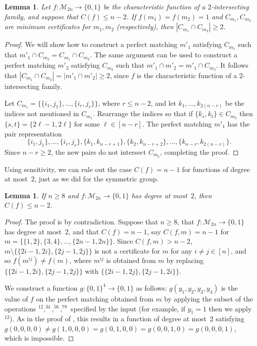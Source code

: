 \documentclass[10pt,a4paper]{amsart}
\newtheorem{lemma}[theorem]{Lemma}
\theoremstyle{definition}
\providecommand{\cM}{\mathcal{M}}
\begin{document}
\begin{lemma} \label{lem:2-int-coset-pms}
Let $f\colon \cM_{2n} \to \{0,1\}$ be the characteristic function of a $2$-intersecting family, and suppose that $C(f) \leq n-2$. If $f(m_1) = f(m_2) = 1$ and $C_{m_1},C_{m_2}$ are minimum certificates for $m_1,m_2$ (respectively), then $|C_{m_1} \cap C_{m_2}| \geq 2$.
\end{lemma}
\begin{proof}
We will show how to construct a perfect matching $m'_1$ satisfying $C_{m_1}$ such that $m'_1 \cap C_{m_2} = C_{m_1} \cap C_{m_2}$. The same argument can be used to construct a perfect matching $m'_2$ satisfying $C_{m_2}$ such that $m'_1 \cap m'_2 = m'_1 \cap C_{m_2}$. It follows that $|C_{m_1} \cap C_{m_2}| = |m'_1 \cap m'_2| \geq 2$, since $f$ is the characteristic function of a $2$-intersecting family.

Let $C_{m_1} = \bigl\{\{i_1,j_1\},\ldots,\{i_r,j_r\}\bigr\}$, where $r \leq n-2$, and let $k_1,\ldots,k_{2(n-r)}$ be the indices not mentioned in $C_{m_1}$. Rearrange the indices so that if $\{k_s,k_t\} \in C_{m_2}$ then $\{s,t\} = \{2\ell-1,2\ell\}$ for some $\ell \in [n-r]$. The perfect matching $m'_1$ has the pair representation
\[
 \{i_1,j_1\},\ldots,\{i_r,j_r\},\{k_1,k_{n-r+1}\},\{k_2,k_{n-r+2}\},\ldots,\{k_{n-r},k_{2(n-r)}\}.
\]
Since $n-r \geq 2$, the new pairs do not intersect $C_{m_2}$, completing the proof.
\end{proof}

Using sensitivity, we can rule out the case $C(f) = n-1$ for functions of degree at most~$2$, just as we did for the symmetric group.

\begin{lemma} \label{lem:C-bound-pms}
If $n \geq 8$ and $f\colon \cM_{2n} \to \{0,1\}$ has degree at most~$2$, then $C(f) \leq n-2$.
\end{lemma}
\begin{proof}
The proof is by contradiction. Suppose that $n \geq 8$, that $f\colon \cM_{2n} \to \{0,1\}$ has degree at most~$2$, and that $C(f) = n-1$, say $C(f,m) = n-1$ for $m = \bigl\{\{1,2\},\{3,4\},\ldots,\{2n-1,2n\}\bigr\}$. Since $C(f,m) > n-2$, $m \setminus \bigl\{\{2i-1,2i\},\{2j-1,2j\}\bigr\}$ is not a certificate for $m$ for any $i \neq j \in [n]$, and so $f(m^{ij}) \neq f(m)$, where $m^{ij}$ is obtained from $m$ by replacing $\bigl\{\{2i-1,2i\},\{2j-1,2j\}\bigr\}$ with $\bigl\{\{2i-1,2j\},\{2j-1,2i\}\bigr\}$.

We construct a function $g\colon \{0,1\}^4 \to \{0,1\}$ as follows: $g(y_1,y_2,y_3,y_4)$ is the value of $f$ on the perfect matching obtained from $m$ by applying the subset of the operations $^{12},^{34},^{56},^{78}$ specified by the input (for example, if $y_1 = 1$ then we apply $^{12}$). As in the proof of , this results in a function of degree at most~$2$ satisfying $g(0,0,0,0) \neq g(1,0,0,0) = g(0,1,0,0) = g(0,0,1,0) = g(0,0,0,1)$, which is impossible.
\end{proof}
\end{document}
